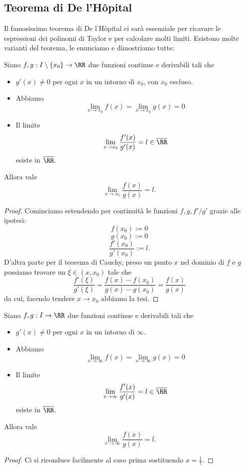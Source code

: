 \documentclass[11pt]{scrartcl}
\begin{document}
	\subsection{Teorema di De l'H\^opital}
	Il famosissimo teorema di De l'H\^opital ci sarà essenziale per ricavare le espressioni dei polinomi di Taylor e per calcolare molti limiti. Esistono molte varianti del teorema, le enunciamo e dimostriamo tutte:
	\begin{theorem}
		Siano $f,g:I\setminus\left\{x_0\right\}\to\RR$ due funzioni continue e derivabili tali che 
		\begin{itemize}
			\item $g'(x)\ne 0$ per ogni $x$ in un intorno di $x_0$, con $x_0$ escluso.
			\item Abbiamo 
			$$\lim_{x\to x_0}f(x)=\lim_{x\to x_0}g(x)=0$$
			\item Il limite 
			$$\lim_{x\to x_0}\frac{f'(x)}{g'(x)}=l\in\overline{\RR}$$
			esiste in $\overline{\RR}$.
		\end{itemize}
		Allora vale
		$$\lim_{x\to x_0}\frac{f(x)}{g(x)}=l.$$
	\end{theorem}
	\begin{proof}
		Cominciamo estendendo per continuità le funzioni $f,g,f'/g'$ grazie alle ipotesi:
		$$f(x_0):=0$$
		$$g(x_0):=0$$
		$$\frac{f'(x_0)}{g'(x_0)}:=l.$$
		D'altra parte per il teorema di Cauchy, preso un punto $x$ nel dominio di $f$ e $g$ possiamo trovare un $\xi\in (x,x_0)$ tale che
		$$\frac{f'(\xi)}{g'(\xi)}=\frac{f(x)-f(x_0)}{g(x)-g(x_0)}=\frac{f(x)}{g(x)}$$
		da cui, facendo tendere $x\to x_0$ abbiamo la tesi.
	\end{proof}
	\begin{theorem}
		Siano $f,g:I\to\RR$ due funzioni continue e derivabili tali che 
		\begin{itemize}
			\item $g'(x)\ne 0$ per ogni $x$ in un intorno di $\infty$.
			\item Abbiamo 
			$$\lim_{x\to \infty}f(x)=\lim_{x\to \infty}g(x)=0$$
			\item Il limite 
			$$\lim_{x\to \infty}\frac{f'(x)}{g'(x)}=l\in\overline{\RR}$$
			esiste in $\overline{\RR}$.
		\end{itemize}
		Allora vale
		$$\lim_{x\to \infty}\frac{f(x)}{g(x)}=l.$$
	\end{theorem}
	\begin{proof}
		Ci si riconduce facilmente al caso prima sostituendo $x=\frac{1}{t}$.
	\end{proof}
\end{document}
